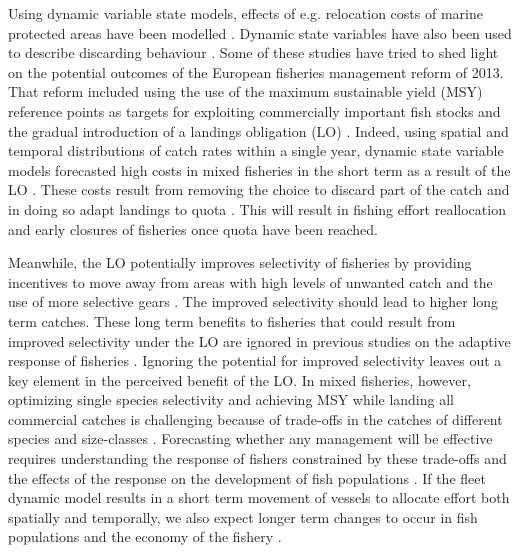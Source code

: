 \documentclass[12pt,oneline,a4paper,numbib]{ouparticle}
\numberwithin{equation}{subsection} %
\begin{document}
Using dynamic variable state models, effects of e.g. relocation costs of marine protected areas have been modelled \cite{Dowling2011}. Dynamic state variables have also been used to describe discarding behaviour \cite{Batsleer2015, Batsleer2013, Gillis1995, Alzorriz2018}. Some of these studies have tried to shed light on the potential outcomes of the European fisheries management reform of 2013. That reform included using the use of the maximum sustainable yield (MSY) reference points as targets for exploiting commercially important fish stocks and the gradual introduction of a landings obligation (LO) \cite{CFP2013}. Indeed, using spatial and temporal distributions of catch rates within a single year, dynamic state variable models forecasted high costs in mixed fisheries in the short term as a result of the LO \cite{Alzorriz2018, Batsleer2013, Batsleer2015}. These costs result from removing the choice to discard part of the catch and in doing so adapt landings to quota \cite{Alzorriz2018}. This will result in fishing effort reallocation and early closures of fisheries once quota have been reached. 

Meanwhile, the LO potentially improves selectivity of fisheries by providing incentives to move away from areas with high levels of unwanted catch and the use of more selective gears \cite{Alzorriz2016, Alzorriz2018}. The improved selectivity should lead to higher long term catches. These long term benefits to fisheries that could result from improved selectivity under the LO are ignored in previous studies on the adaptive response of fisheries \cite{Batsleer2015, Batsleer2013, Alzorriz2018}. Ignoring the potential for improved selectivity leaves out a key element in the perceived benefit of the LO. In mixed fisheries, however, optimizing single species selectivity and achieving MSY while landing all commercial catches is challenging because of trade-offs in the catches of different species and size-classes \cite{Batsleer2013, Ulrich2017}. Forecasting whether any management will be effective requires understanding the response of fishers constrained by these trade-offs and the effects of the response on the development of fish populations \cite{Venables2009}. If the fleet dynamic model results in a short term movement of vessels to allocate effort both spatially and temporally, we also expect longer term changes to occur in fish populations and the economy of the fishery \cite{Alzorriz2018}.
\end{document}
